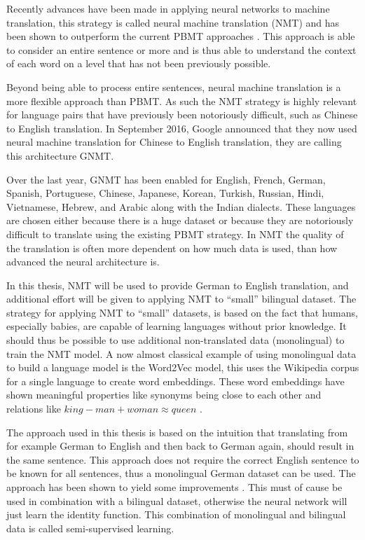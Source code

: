 Recently advances have been made in applying neural networks to machine translation, this strategy is called neural machine translation (NMT) and has been shown to outperform the current PBMT approaches \cite{google-translate-gnmt}. This approach is able to consider an entire sentence or more and is thus able to understand the context of each word on a level that has not been previously possible.

Beyond being able to process entire sentences, neural machine translation is a more flexible approach than PBMT. As such the NMT strategy is highly relevant for language pairs that have previously been notoriously difficult, such as Chinese to English translation. In September 2016, Google announced that they now used neural machine translation for Chinese to English translation, they are calling this architecture GNMT.

Over the last year, GNMT has been enabled for English, French, German, Spanish, Portuguese, Chinese, Japanese, Korean, Turkish, Russian, Hindi, Vietnamese, Hebrew, and Arabic along with the Indian dialects. These languages are chosen either because there is a huge dataset or because they are notoriously difficult to translate using the existing PBMT strategy. In NMT the quality of the translation is often more dependent on how much data is used, than how advanced the neural architecture is.

In this thesis, NMT will be used to provide German to English translation, and additional effort will be given to applying NMT to ``small'' bilingual dataset. The strategy for applying NMT to ``small'' datasets, is based on the fact that humans, especially babies, are capable of learning languages without prior knowledge. It should thus be possible to use additional non-translated data (monolingual) to train the NMT model. A now almost classical example of using monolingual data to build a language model is the Word2Vec model, this uses the Wikipedia corpus for a single language to create word embeddings. These word embeddings have shown meaningful properties like synonyms being close to each other and relations like $king - man + woman \approx queen$ \cite{word2vec}.

The approach used in this thesis is based on the intuition that translating from for example German to English and then back to German again, should result in the same sentence. This approach does not require the correct English sentence to be known for all sentences, thus a monolingual German dataset can be used. The approach has been shown to yield some improvements \cite{semi-supervised}. This must of cause be used in combination with a bilingual dataset, otherwise the neural network will just learn the identity function. This combination of monolingual and bilingual data is called semi-supervised learning.

